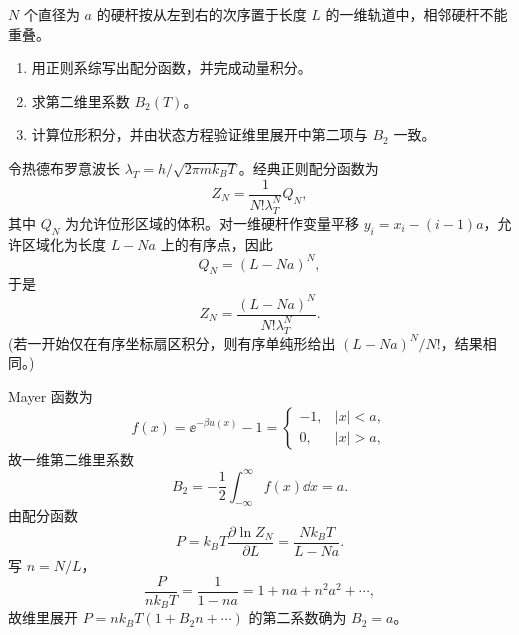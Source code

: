 \begin{question}[10 分]
$N$ 个直径为 $a$ 的硬杆按从左到右的次序置于长度 $L$ 的一维轨道中，相邻硬杆不能重叠。
\begin{enumerate}
  \item 用正则系综写出配分函数，并完成动量积分。
  \item 求第二维里系数 $B_2(T)$。
  \item 计算位形积分，并由状态方程验证维里展开中第二项与 $B_2$ 一致。
\end{enumerate}
\begin{solution}
令热德布罗意波长 $\lambda_T=h/\sqrt{2\pi mk_BT}$。经典正则配分函数为
\[Z_N=\frac{1}{N!\lambda_T^N}Q_N,\]
其中 $Q_N$ 为允许位形区域的体积。对一维硬杆作变量平移 $y_i=x_i-(i-1)a$，允许区域化为长度 $L-Na$ 上的有序点，因此
\[Q_N=(L-Na)^N,\]
于是
\[\boxed{Z_N=\frac{(L-Na)^N}{N!\lambda_T^N}}.\]
(若一开始仅在有序坐标扇区积分，则有序单纯形给出 $(L-Na)^N/N!$，结果相同。)

Mayer 函数为
\[f(x)=\ee^{-\beta u(x)}-1=\begin{cases}-1,&|x|<a,\\0,&|x|>a,\end{cases}\]
故一维第二维里系数
\[\boxed{B_2=-\frac12\int_{-\infty}^{\infty}f(x)\dd{x}=a}.\]
由配分函数
\[P=k_BT\frac{\partial\ln Z_N}{\partial L}=\frac{Nk_BT}{L-Na}.\]
写 $n=N/L$，
\[\frac{P}{nk_BT}=\frac{1}{1-na}=1+na+n^2a^2+\cdots,\]
故维里展开 $P=nk_BT(1+B_2n+\cdots)$ 的第二系数确为 $\boxed{B_2=a}$。
\end{solution}
\end{question}
